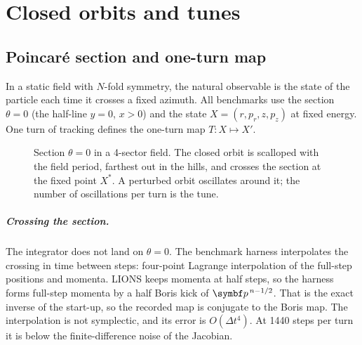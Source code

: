 \chapter{Closed orbits and tunes}\label{ch:orbits}

\section{Poincar\'e section and one-turn map}
In a static field with $N$-fold symmetry, the natural observable is the state of the particle each time it crosses a
fixed azimuth.
All benchmarks use the section $\theta = 0$ (the half-line $y = 0$, $x>0$) and the state
$X = (r, p_r, z, p_z)$ at fixed energy.
One turn of tracking defines the one-turn map $T: X\mapsto X'$.

\begin{figure}[h]
\centering
{}
\caption{Section $\theta = 0$ in a 4-sector field.
The closed orbit is scalloped with the field period, farthest out in the hills, and crosses the section at the fixed
point $X^*$.
A perturbed orbit oscillates around it; the number of oscillations per turn is the tune.}
\label{fig:section}
\end{figure}

\paragraph{Crossing the section.}
The integrator does not land on $\theta = 0$.
The benchmark harness interpolates the crossing in time between steps: four-point Lagrange interpolation of the
full-step positions and momenta.
LIONS keeps momenta at half steps, so the harness forms full-step momenta by a half Boris kick of $\vect p^{\,n-1/2}$.
That is the exact inverse of the start-up, so the recorded map is conjugate to the Boris map.
The interpolation is not symplectic, and its error is $O(\Delta t^4)$.
At 1440 steps per turn it is below the finite-difference noise of the Jacobian.

